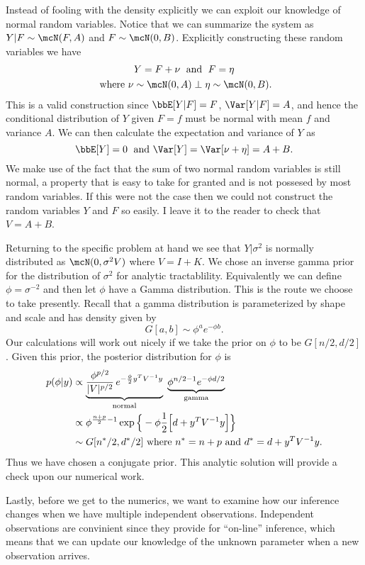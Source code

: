 \documentclass{report}
\begin{document}
Instead of fooling with the density explicitly we can exploit our knowledge of normal random variables.  Notice that we can summarize the system as $Y|F \sim \mcN(F, A)$ and $F \sim \mcN(0, B)$.  Explicitly constructing these random variables we have
\begin{gather*}
Y = F + \nu \; \textmd{ and } \; F = \eta \\
\textmd{ where } \nu \sim \mcN(0,A) \perp \eta \sim \mcN(0,B).
\end{gather*}
This is a valid construction since $\bbE[Y|F] = F$, $\Var[Y|F] = A$, and hence the conditional distribution of $Y$ given $F = f$ must be normal with mean $f$ and variance $A$.  We can then calculate the expectation and variance of $Y$ as
\[
\bbE[Y] = 0 \; \textmd{ and } \Var[Y] = \Var[\nu + \eta] = A + B.
\]
We make use of the fact that the sum of two normal random variables is still normal, a property that is easy to take for granted and is not possesed by most random variables.  If this were not the case then we could not construct the random variables $Y$ and $F$ so easily.  I leave it to the reader to check that $V = A + B$.

Returning to the specific problem at hand we see that $Y | \sigma^2$ is normally distributed as $\mcN(0, \sigma^2 V )$ where $V = I + K$.  We chose an inverse gamma prior for the distribution of $\sigma^2$ for analytic tractablility.  Equivalently we can define $\phi = \sigma^{-2}$ and then let $\phi$ have a Gamma distribution.  This is the route we choose to take presently.  Recall that a gamma distribution is parameterized by shape and scale and has density given by
\[
G[a, b] \sim \phi^{a} e^{-\phi b}.
\]
Our calculations will work out nicely if we take the prior on $\phi$ to be $G[n/2, d/2]$.  Given this prior, the posterior distribution for $\phi$ is
\begin{align*}
p(\phi | y) & \propto \underbrace{\frac{\phi^{p/2}}{|V|^{p/2}} \, e^{-\frac{\phi}{2} y^T V^{-1} y}}_{\textmd{normal}} \; \underbrace{\phi^{n/2-1} e^{-\phi d/2}}_{\textmd{gamma}} \\
& \propto \phi^{\frac{n+p}{2} - 1} \exp \Big\{ - \phi \frac{1}{2}\Big[ d + y^T V^{-1} y \Big] \Big\} \\
& \sim G[n^*/2, d^*/2] \textmd{ where } n^* = n + p \textmd{ and } d^* = d + y^T V^{-1} y.
\end{align*}
Thus we have chosen a conjugate prior.  This analytic solution will provide a check upon our numerical work.

Lastly, before we get to the numerics, we want to examine how our inference changes when we have multiple independent observations.  Independent observations are convinient since they provide for ``on-line'' inference, which means that we can update our knowledge of the unknown parameter when a new observation arrives.
\end{document}
